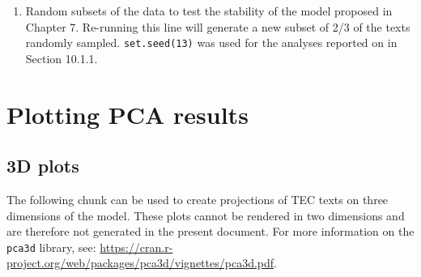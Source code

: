 \documentclass[
  letterpaper,
  DIV=11,
  numbers=noendperiod]{scrreprt}
\newenvironment{Shaded}{\begin{snugshade}}{\end{snugshade}}
\newcommand{\AttributeTok}[1]{\textcolor[rgb]{0.40,0.45,0.13}{#1}}
\newcommand{\CommentTok}[1]{\textcolor[rgb]{0.37,0.37,0.37}{#1}}
\newcommand{\ConstantTok}[1]{\textcolor[rgb]{0.56,0.35,0.01}{#1}}
\newcommand{\DecValTok}[1]{\textcolor[rgb]{0.68,0.00,0.00}{#1}}
\newcommand{\FloatTok}[1]{\textcolor[rgb]{0.68,0.00,0.00}{#1}}
\newcommand{\FunctionTok}[1]{\textcolor[rgb]{0.28,0.35,0.67}{#1}}
\newcommand{\NormalTok}[1]{\textcolor[rgb]{0.00,0.23,0.31}{#1}}
\newcommand{\OtherTok}[1]{\textcolor[rgb]{0.00,0.23,0.31}{#1}}
\newcommand{\SpecialCharTok}[1]{\textcolor[rgb]{0.37,0.37,0.37}{#1}}
\newcommand{\StringTok}[1]{\textcolor[rgb]{0.13,0.47,0.30}{#1}}
\providecommand{\tightlist}{%
  \setlength{\itemsep}{0pt}\setlength{\parskip}{0pt}}\usepackage{longtable,booktabs,array}
\begin{document}
\begin{enumerate}
\def\labelenumi{\roman{enumi}.}
\tightlist
\item
  Random subsets of the data to test the stability of the model proposed
  in Chapter 7. Re-running this line will generate a new subset of 2/3
  of the texts randomly sampled. \texttt{set.seed(13)} was used for the
  analyses reported on in Section 10.1.1.
\end{enumerate}

\begin{Shaded}
\end{Shaded}

\section{Plotting PCA results}\label{plotting-pca-results-1}

\subsection{3D plots}\label{d-plots-1}

The following chunk can be used to create projections of TEC texts on
three dimensions of the model. These plots cannot be rendered in two
dimensions and are therefore not generated in the present document. For
more information on the \texttt{pca3d} library, see:
\url{https://cran.r-project.org/web/packages/pca3d/vignettes/pca3d.pdf}.
\end{document}
